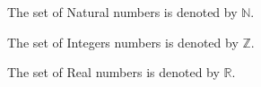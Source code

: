 \documentclass[12pt]{article}
\begin{document}
The set of Natural numbers is denoted by $\mathbb{N}$.

The set of Integers numbers is denoted by $\mathbb{Z}$.

The set of Real numbers is denoted by $\mathbb{R}$.
\end{document}
